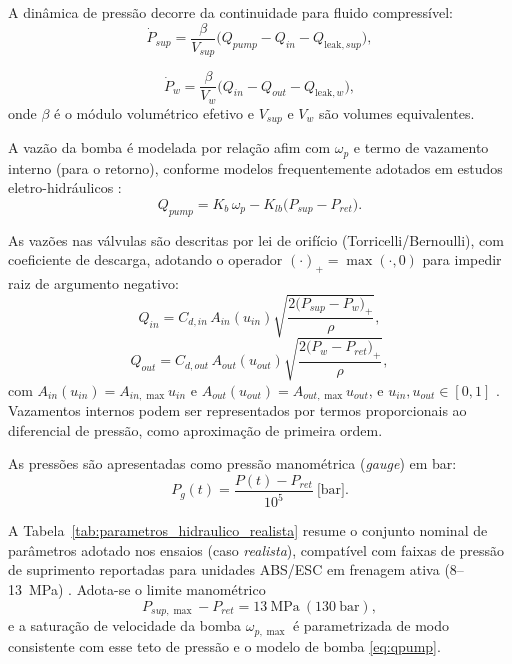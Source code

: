 \documentclass[a4paper]{ifacconf}
\begin{document}
A dinâmica de pressão decorre da continuidade para fluido compressível:
\begin{equation}
   \dot{P}_{sup} = \frac{\beta}{V_{sup}}\big(Q_{pump}-Q_{in}-Q_{\mathrm{leak},sup}\big),
   \label{eq:pressure_sup}
\end{equation}

\begin{equation}
   \dot{P}_{w} = \frac{\beta}{V_{w}}\big(Q_{in}-Q_{out}-Q_{\mathrm{leak},w}\big),
   \label{eq:pressure_wheel}
\end{equation}
onde $\beta$ é o módulo volumétrico efetivo e $V_{sup}$ e $V_w$ são volumes equivalentes.

A vazão da bomba é modelada por relação afim com $\omega_p$ e termo de vazamento interno (para o retorno), conforme modelos frequentemente adotados em estudos eletro-hidráulicos \cite{MotorParametricDesign2023,WangBingbing2015}:
\begin{equation}
   Q_{pump} = K_b\,\omega_p - K_{lb}\big(P_{sup}-P_{ret}\big).
   \label{eq:qpump}
\end{equation}

As vazões nas válvulas são descritas por lei de orifício (Torricelli/Bernoulli), com coeficiente de descarga, adotando o operador $(\cdot)_+=\max(\cdot,0)$ para impedir raiz de argumento negativo:
\begin{equation}
   Q_{in} = C_{d,in}\,A_{in}(u_{in})\sqrt{\frac{2\big(P_{sup}-P_w\big)_+}{\rho}},
   \label{eq:qin}
\end{equation}
\begin{equation}
   Q_{out} = C_{d,out}\,A_{out}(u_{out})\sqrt{\frac{2\big(P_{w}-P_{ret}\big)_+}{\rho}},
   \label{eq:qout}
\end{equation}
com $A_{in}(u_{in})=A_{in,\max}u_{in}$ e $A_{out}(u_{out})=A_{out,\max}u_{out}$, e $u_{in},u_{out}\in[0,1]$ \cite{ChenLv2017,ProportionalPressureABS2023,Lv2014}. Vazamentos internos podem ser representados por termos proporcionais ao diferencial de pressão, como aproximação de primeira ordem.

As pressões são apresentadas como pressão manométrica (\textit{gauge}) em bar:
\begin{equation}
   P_{g}(t) = \frac{P(t)-P_{ret}}{10^5}\ \text{[bar]}.
   \label{eq:pressao_gauge_bar}
\end{equation}

A Tabela~\ref{tab:parametros_hidraulico_realista} resume o conjunto nominal de parâmetros adotado nos ensaios (caso \textit{realista}), compatível com faixas de pressão de suprimento reportadas para unidades ABS/ESC em frenagem ativa (8--13~MPa) \cite{ZengYangHuang2023,HouhuaJing2022}. Adota-se o limite manométrico
\begin{equation}
   P_{sup,\max}-P_{ret} = 13~\text{MPa}\ (130~\text{bar}),
   \label{eq:psup_max_assumido}
\end{equation}
e a saturação de velocidade da bomba $\omega_{p,\max}$ é parametrizada de modo consistente com esse teto de pressão e o modelo de bomba \eqref{eq:qpump}.
\end{document}
